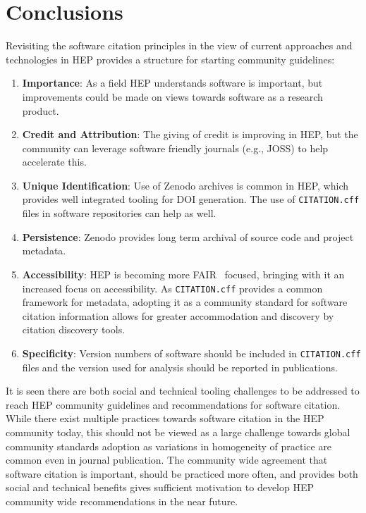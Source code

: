 \section{Conclusions}\label{sec:conclusions}

Revisiting the software citation principles in the view of current approaches and technologies in HEP provides a structure for starting community guidelines:

\begin{enumerate}
    \item \textbf{Importance}: As a field HEP understands software is important, but improvements could be made on views towards software as a research product.
    \item \textbf{Credit and Attribution}: The giving of credit is improving in HEP, but the community can leverage software friendly journals (e.g., JOSS) to help accelerate this.
    \item \textbf{Unique Identification}: Use of Zenodo archives is common in HEP, which provides well integrated tooling for DOI generation.
The use of \texttt{CITATION.cff} files in software repositories can help as well.
    \item \textbf{Persistence}: Zenodo provides long term archival of source code and project metadata.
    \item \textbf{Accessibility}: HEP is becoming more FAIR~\cite{wilkinson_fair_2016,chue_hong_neil_p_2022_6623556} focused, bringing with it an increased focus on accessibility.
As \texttt{CITATION.cff} provides a common framework for metadata, adopting it as a community standard for software citation information allows for greater accommodation and discovery by citation discovery tools.
    \item \textbf{Specificity}: Version numbers of software should be included in \texttt{CITATION.cff} files and the version used for analysis should be reported in publications.
\end{enumerate}

It is seen there are both social and technical tooling challenges to be addressed to reach HEP community guidelines and recommendations for software citation.
While there exist multiple practices towards software citation in the HEP community today, this should not be viewed as a large challenge towards global community standards adoption as variations in homogeneity of practice are common even in journal publication.
The community wide agreement that software citation is important, should be practiced more often, and provides both social and technical benefits gives sufficient motivation to develop HEP community wide recommendations in the near future.
